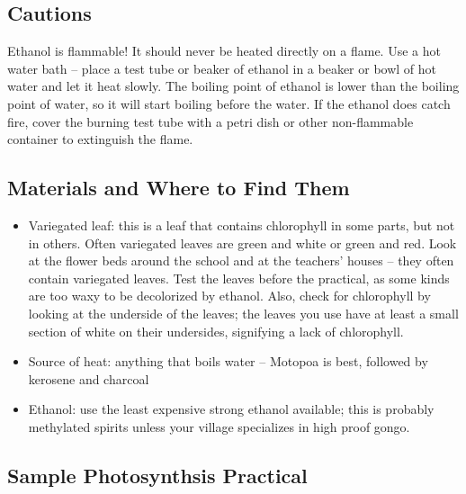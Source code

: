 \subsection{Cautions}
Ethanol is flammable! It should never be heated directly on a flame. Use a hot water bath -- place a test tube or beaker of ethanol in a beaker or bowl of hot water and let it heat slowly. The boiling point of ethanol is lower than the boiling point of water, so it will start boiling before the water. If the ethanol does catch fire, cover the burning test tube with a petri dish or other non-flammable container to extinguish the flame.

\subsection{Materials and Where to Find Them}
\begin{itemize}
\item{Variegated leaf: this is a leaf that contains chlorophyll in some parts, but not in others. Often variegated leaves are green and white or green and red. Look at the flower beds around the school and at the teachers' houses -- they often contain variegated leaves. Test the leaves before the practical, as some kinds are too waxy to be decolorized by ethanol. Also, check for chlorophyll by looking at the underside of the leaves; the leaves you use have at least a small section of white on their undersides, signifying a lack of chlorophyll.}
\item{Source of heat: anything that boils water -- Motopoa is best, followed by kerosene and charcoal}
\item{Ethanol: use the least expensive strong ethanol available; this is probably methylated spirits unless your village specializes in high proof gongo.}
\end{itemize}

\subsection{Sample Photosynthsis Practical}

